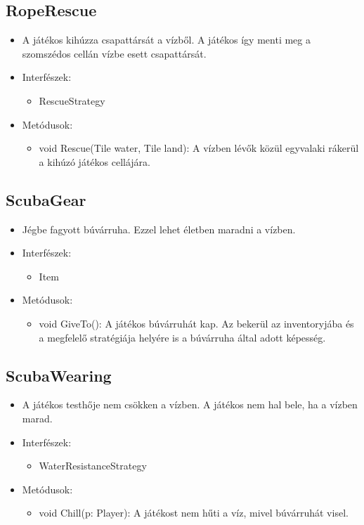 \subsection{RopeRescue}
\begin{itemize}
	\item A játékos kihúzza csapattársát a vízből. A játékos így menti meg a szomszédos cellán vízbe esett csapattársát.
	\item Interfészek:
	\begin{itemize}
		\item RescueStrategy
	\end{itemize}
	\item Metódusok:
	\begin{itemize}
		\item void Rescue(Tile water, Tile land): A vízben lévők közül egyvalaki rákerül a kihúzó játékos cellájára.
	\end{itemize}
\end{itemize}

\subsection{ScubaGear}
\begin{itemize}
	\item Jégbe fagyott búvárruha. Ezzel lehet életben maradni a vízben.
	\item Interfészek:
	\begin{itemize}
		\item Item
	\end{itemize}
	\item Metódusok:
	\begin{itemize}
		\item void GiveTo(): A játékos búvárruhát kap. Az bekerül az inventoryjába és a megfelelő stratégiája helyére is a búvárruha által adott képesség.
	\end{itemize}
\end{itemize}

\subsection{ScubaWearing}
\begin{itemize}
	\item A játékos testhője nem csökken a vízben. A játékos nem hal bele, ha a vízben marad.
	\item Interfészek:
	\begin{itemize}
		\item WaterResistanceStrategy
	\end{itemize}
	\item Metódusok:
	\begin{itemize}
		\item void Chill(p: Player): A játékost nem hűti a víz, mivel búvárruhát visel.
	\end{itemize}
\end{itemize}

